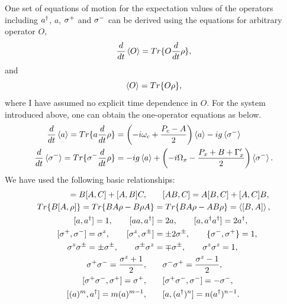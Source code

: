 One set of equations of motion for the expectation values of the operators including $a^{\dagger}$, $a$, $\sigma^{+}$ and $\sigma^{-}$ can be derived using the equations for arbitrary operator $O$,
\begin{equation}
 \frac{d}{dt} \mathinner{\langle{O}\rangle}=Tr\lbrace O \frac{d}{dt} \rho\rbrace,
\end{equation}
and
\begin{equation}
 \mathinner{\langle{O}\rangle}=Tr\lbrace O \rho\rbrace,
\end{equation}
where I have assumed no explicit time dependence in $O$.
For the system introduced above, one can obtain the one-operator equations as below.
\begin{align}
  \frac{d}{dt} \mathinner{\langle{a}\rangle} =Tr\lbrace a \frac{d}{dt} \rho\rbrace &=\left(-i\omega_c+\frac{P_c-A}{2}\right)\mathinner{\langle{a}\rangle}-ig\mathinner{\langle{\sigma^{-}}\rangle} \label{eq:a}\\
  \frac{d}{dt} \mathinner{\langle{\sigma^{-}}\rangle} =Tr\lbrace\sigma^{-} \frac{d}{dt} \rho\rbrace &=-ig\mathinner{\langle{a}\rangle}+\left(-i\Omega_x-\frac {P_x+B+\Gamma_x^{\prime}}{2}\right)\mathinner{\langle{\sigma^{-}}\rangle}. \label{eq:s}
\end{align}
We have used the following basic relationships:
\begin{align}
[A,BC]=B[A,C]+[A,B]C, \quad &\quad [AB,C]=A[B,C]+[A,C]B,\\
Tr\lbrace B[A,\rho]\rbrace = Tr\lbrace BA\rho-B\rho A\rbrace &=Tr\lbrace BA\rho-AB\rho\rbrace=\braket{[B,A]},\\
[a,\adag]=1,\quad \quad [aa,\adag] &=2a, \quad \quad [a,\adag\adag]=2\adag,\\
[\sigp,\sigm]=\sigma^z,\quad\quad [\sigma^z,\sigma^{\pm}] &=\pm 2\sigma^{\pm},\quad\quad \lbrace \sigm,\sigp\rbrace=1,\\
\sigma^z \sigma^{\pm}=\pm \sigma^{\pm},\quad \quad \sigma^{\pm}\sigma^z &=\mp \sigma^{\pm}, \quad \quad \sigma^z\sigma^z=1,\\
\sigp \sigm =\frac{\sigma^z+1}{2},\quad &\quad \sigm\sigp = \frac{\sigma^z-1}{2},\\
[\sigp\sigm,\sigp]=\sigp,\quad &\quad [\sigp\sigm, \sigm]=-\sigm,\\
[(a)^m,\adag]=m(a)^{m-1},\quad &\quad [a,(\adag)^n]=n(\adag)^{n-1}.
\end{align}

